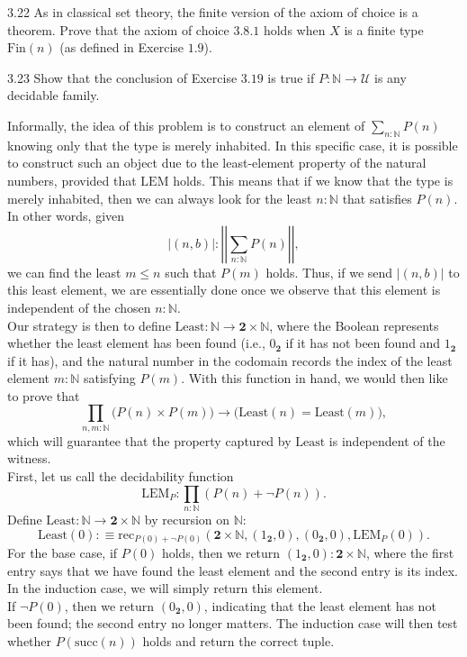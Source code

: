 \documentclass[14pt]{extarticle}
\newcommand{\N}{{\mathbb N}}
\newcommand{\0}{{\mathbf 0}}
\newcommand{\1}{{\mathbf 1}}
\newcommand{\2}{{\mathbf 2}}
\newcommand{\UU}{{\mathcal U}}
\newcommand{\rec}{\mathrm{rec}}
\newcommand{\su}{\mathrm{succ}}
\newcommand{\LEM}{\mathrm{LEM}}
\begin{document}
\begin{prob}{3.22}{}
As in classical set theory, the finite version of the axiom of choice is a theorem. Prove that the axiom of choice $3.8.1$ holds when $X$ is a finite type $\text{Fin}(n)$ (as defined in Exercise $1.9$).
\end{prob}

\begin{prob}{3.23}{}
Show that the conclusion of Exercise $3.19$ is true if $P : \N \to \UU$ is any decidable family.
\end{prob}
Informally, the idea of this problem is to construct an element of $\sum_{n:\N}P(n)$ knowing only that the type is merely inhabited. In this specific case, it is possible to construct such an object due to the least-element property of the natural numbers, provided that $\LEM$ holds. This means that if we know that the type is merely inhabited, then we can always look for the least $n:\N$ that satisfies $P(n)$. In other words, given \[|(n,b)| : \left|\left|\sum_{n:\N}P(n)\right|\right|,\] we can find the least $m \leq n$ such that $P(m)$ holds. Thus, if we send $|(n,b)|$ to this least element, we are essentially done once we observe that this element is independent of the chosen $n:\N$.\\
Our strategy is then to define $\text{Least} : \N \to \2 \times \N$, where the Boolean represents whether the least element has been found (i.e., $0_\2$ if it has not been found and $1_\2$ if it has), and the natural number in the codomain records the index of the least element $m:\N$ satisfying $P(m)$. With this function in hand, we would then like to prove that \[\prod_{n,m:\N}\Big(P(n)\times P(m)\Big) \to \Big(\text{Least}(n) = \text{Least}(m)\Big),\] which will guarantee that the property captured by $\text{Least}$ is independent of the witness.\\
First, let us call the decidability function
\[\LEM_P : \prod_{n:\N} (P(n) + \neg P(n)).\]
Define $\text{Least} : \N \to \2 \times \N$ by recursion on $\N$:
\[\text{Least}(0) : \equiv \rec_{P(0)+\neg P(0)}(\2 \times \N, (1_\2, 0),(0_\2, 0), \LEM_P(0)).\]
For the base case, if $P(0)$ holds, then we return $(1_\2, 0) : \2 \times \N$, where the first entry says that we have found the least element and the second entry is its index. In the induction case, we will simply return this element.\\
If $\neg P(0)$, then we return $(0_\2, 0)$, indicating that the least element has not been found; the second entry no longer matters. The induction case will then test whether $P(\su(n))$ holds and return the correct tuple.\\
\end{document}
